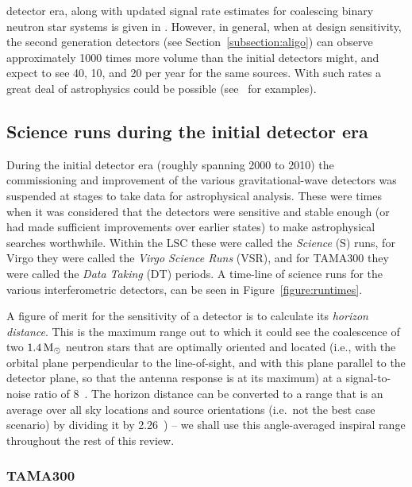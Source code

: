 detector era, along with updated signal rate estimates for coalescing binary neutron star systems is given 
in \cite{lrr-2016-1}. However, in general, when at design sensitivity, the second generation detectors (see 
Section~\ref{subsection:aligo}) can observe approximately 1000 times more volume than the initial detectors 
might, and expect to see 40, 10, and 20 per year for the same sources. With such rates a great deal of 
astrophysics could be possible (see~\cite{Sathyaprakash:2009} for examples).

\subsection{Science runs during the initial detector era}
\label{subsection:runs} 

During the initial detector era (roughly spanning 2000 to 2010) the commissioning and improvement of the 
various gravitational-wave detectors was suspended at stages to take data for astrophysical analysis. These 
were times when it was considered that the detectors were sensitive and stable enough (or had made sufficient
improvements over earlier states) to make astrophysical searches worthwhile. Within the LSC these were called 
the \textit{Science} (S) runs, for Virgo they were called the \textit{Virgo Science Runs} (VSR), and for 
TAMA300 they were called the \textit{Data Taking} (DT) periods. A time-line of science runs for the various
interferometric detectors, can be seen in Figure~\ref{figure:runtimes}. 

A figure of merit for the sensitivity of a detector is to calculate its \textit{horizon distance}. This is 
the maximum range out to which it could see the coalescence of two $1.4\,{\rm M}_{\odot}$ neutron stars
that are optimally oriented and located (i.e., with the orbital plane perpendicular to the line-of-sight, and 
with this plane parallel to the detector plane, so that the antenna response is at its maximum) at
a signal-to-noise ratio of 8~\cite{Abbott:2005b}. The horizon distance can be converted to a range that is an 
average over all sky locations and source orientations (i.e.\ not the best case scenario) by dividing
it by 2.26~\cite{Sutton:2003}) -- we shall use this angle-averaged inspiral range throughout the rest of this 
review.

\subsubsection{TAMA300}

